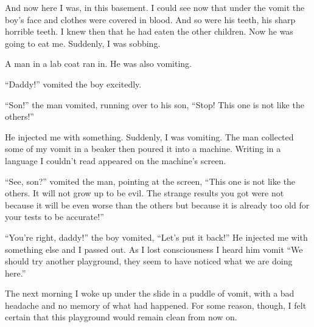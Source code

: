 And now here I was, in this basement. I could see now that under
the vomit the boy's face and clothes were covered in blood.
And so were his teeth, his sharp horrible teeth. I knew then that
he had eaten the other children. Now he was going to eat me.
Suddenly, I was sobbing.



A man in a lab coat ran in. He was also vomiting.



``Daddy!'' vomited the boy excitedly.



``Son!'' the man vomited, running over to his son,
``Stop! This one is not like the others!''



He injected me with something. Suddenly, I was vomiting. The man
collected some of my vomit in a beaker then poured it into a
machine. Writing in a language I couldn't read appeared on
the machine's screen.



``See, son?'' vomited the man, pointing at the screen,
``This one is not like the others. It will not grow up to be
evil. The strange results you got were not because it will be even
worse than the others but because it is already too old for your
tests to be accurate!''



``You're right, daddy!'' the boy vomited,
``Let's put it back!'' He injected me with
something else and I passed out. As I lost consciousness I heard
him vomit ``We should try another playground, they seem to
have noticed what we are doing here.''



The next morning I woke up under the slide in a puddle of vomit,
with a bad headache and no memory of what had happened. For some
reason, though, I felt certain that this playground would remain
clean from now on. 
 



